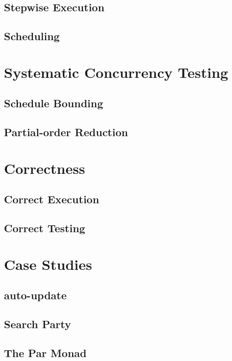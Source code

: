 \documentclass[openright, dottedtoc, headinclude, footinclude=true, a4paper, numbers=noenddot, fontsize=10pt]{scrreprt}
\newcommand{\Section}[2]{\section{#2}%
\label{chap:#1}%
}
\begin{document}
  \subsection{Stepwise Execution}
  \label{sec:execution-stepwise}
  

  \subsection{Scheduling}
  \label{sec:execution-scheduling}
  

\Section{sct}{Systematic Concurrency Testing}
  \subsection{Schedule Bounding}
  \label{sec:sct-bounding}
  

  \subsection{Partial-order Reduction}
  \label{sec:sct-por}
  

\Section{correctness}{Correctness}
  \subsection{Correct Execution}
  \label{sec:correctness-execution}
  

  \subsection{Correct Testing}
  \label{sec:correctness-testing}
  

\Section{casestudies}{Case Studies}
  \subsection{auto-update}
  \label{sec:casestudies-autoupdate}
  

  \subsection{Search Party}
  \label{sec:casestudies-searchparty}
  

  \subsection{The Par Monad}
  \label{sec:casestudies-parmonad}
  
\end{document}
